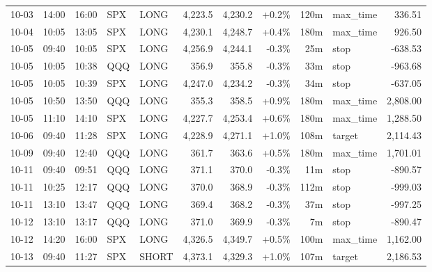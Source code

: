 \documentclass[11pt,a4paper,twoside]{article}
\begin{document}
\begin{center}
\begin{longtable}{>{\color{txtmain}}l l l l l r r r r >{\color{txtmain}}l r}
10-03 & 14:00 & 16:00 & SPX & LONG & 4,223.5 & 4,230.2 & \textcolor{wingreen}{+0.2\%} & 120m & max\_time & \textcolor{wingreen}{336.51} \\
10-04 & 10:05 & 13:05 & SPX & LONG & 4,230.1 & 4,248.7 & \textcolor{wingreen}{+0.4\%} & 180m & max\_time & \textcolor{wingreen}{926.50} \\
10-05 & 09:40 & 10:05 & SPX & LONG & 4,256.9 & 4,244.1 & \textcolor{lossred}{-0.3\%} & 25m & stop & \textcolor{lossred}{-638.53} \\
10-05 & 10:05 & 10:38 & QQQ & LONG & 356.9 & 355.8 & \textcolor{lossred}{-0.3\%} & 33m & stop & \textcolor{lossred}{-963.68} \\
10-05 & 10:05 & 10:39 & SPX & LONG & 4,247.0 & 4,234.2 & \textcolor{lossred}{-0.3\%} & 34m & stop & \textcolor{lossred}{-637.05} \\
10-05 & 10:50 & 13:50 & QQQ & LONG & 355.3 & 358.5 & \textcolor{wingreen}{+0.9\%} & 180m & max\_time & \textcolor{wingreen}{2,808.00} \\
10-05 & 11:10 & 14:10 & SPX & LONG & 4,227.7 & 4,253.4 & \textcolor{wingreen}{+0.6\%} & 180m & max\_time & \textcolor{wingreen}{1,288.50} \\
10-06 & 09:40 & 11:28 & SPX & LONG & 4,228.9 & 4,271.1 & \textcolor{wingreen}{+1.0\%} & 108m & target & \textcolor{wingreen}{2,114.43} \\
10-09 & 09:40 & 12:40 & QQQ & LONG & 361.7 & 363.6 & \textcolor{wingreen}{+0.5\%} & 180m & max\_time & \textcolor{wingreen}{1,701.01} \\
10-11 & 09:40 & 09:51 & QQQ & LONG & 371.1 & 370.0 & \textcolor{lossred}{-0.3\%} & 11m & stop & \textcolor{lossred}{-890.57} \\
10-11 & 10:25 & 12:17 & QQQ & LONG & 370.0 & 368.9 & \textcolor{lossred}{-0.3\%} & 112m & stop & \textcolor{lossred}{-999.03} \\
10-11 & 13:10 & 13:47 & QQQ & LONG & 369.4 & 368.2 & \textcolor{lossred}{-0.3\%} & 37m & stop & \textcolor{lossred}{-997.25} \\
10-12 & 13:10 & 13:17 & QQQ & LONG & 371.0 & 369.9 & \textcolor{lossred}{-0.3\%} & 7m & stop & \textcolor{lossred}{-890.47} \\
10-12 & 14:20 & 16:00 & SPX & LONG & 4,326.5 & 4,349.7 & \textcolor{wingreen}{+0.5\%} & 100m & max\_time & \textcolor{wingreen}{1,162.00} \\
10-13 & 09:40 & 11:27 & SPX & SHORT & 4,373.1 & 4,329.3 & \textcolor{wingreen}{+1.0\%} & 107m & target & \textcolor{wingreen}{2,186.53} \\

\end{longtable}
\end{center}
\end{document}
